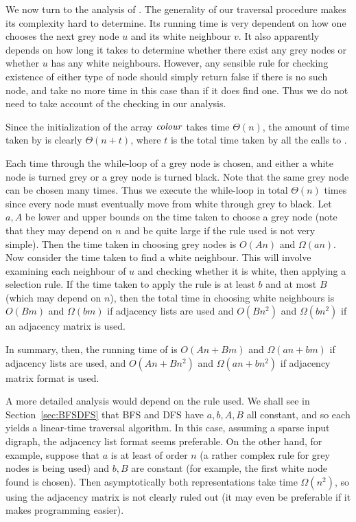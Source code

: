 We now turn to the analysis of . The generality
of our traversal procedure makes its complexity hard to determine.  Its
running time is very dependent on how one chooses the next grey node $u$
and its white neighbour $v$. It also apparently depends on how long it
takes to determine whether there exist any grey nodes or whether $u$ has
any white neighbours. However, any sensible rule for checking existence
of either type of node should simply return false if there is no such
node, and take no more time in this case than if it does find one. Thus
we do not need to take account of the checking in our analysis.

Since the initialization of the array $\operatorname{\text{\textit{colour}}}$ takes time 
$\Theta(n)$, the amount of time taken by  
is clearly $\Theta(n + t)$, where $t$ is the total time taken by all 
the calls to .

Each time through the while-loop of  a grey node is
chosen, and either a white node is turned grey or a grey node is turned
black. Note that the same grey node can be chosen many times. Thus
we execute the while-loop in total $\Theta(n)$ times since every node
must eventually move from white through grey to black. Let $a, A$ be
lower and upper bounds on the time taken to choose a grey node (note
that they may depend on $n$ and be quite large if the rule used is not
very simple). Then the time taken in choosing grey nodes is $O(An)$ and
$\Omega(an)$. Now consider the time taken to find a white neighbour. This
will involve examining each  neighbour of $u$ and checking whether it is
white, then applying a selection rule. If the time taken to apply the rule
is at least $b$ and at most $B$ (which may depend on $n$), then the total 
time in
choosing white neighbours is $O(Bm)$ and $\Omega(bm)$ if adjacency lists
are used and $O(Bn^2)$ and $\Omega(bn^2)$ if an adjacency matrix is used.

In summary, then, the running time of  is $O(An + Bm)$
and $\Omega(an + bm)$ if adjacency lists are used, and $O(An + Bn^2)$
and $\Omega(an + bn^2)$ if adjacency matrix format is used.

A more detailed analysis would depend on the rule used. We shall see
in Section~\ref{sec:BFSDFS} that BFS and DFS have $a, b, A, B$ all
constant, and so each yields a linear-time traversal algorithm. In this
case, assuming a sparse input digraph, the adjacency list format seems
preferable. On the other hand, for example, suppose that $a$ is at least
of order $n$ (a rather complex rule for grey nodes is being used) and $b,
B$ are constant (for example, the first white node found is chosen). Then
asymptotically both representations take time $\Omega(n^2)$, so using
the adjacency matrix is not clearly ruled out (it may even be preferable
if it makes programming easier).

